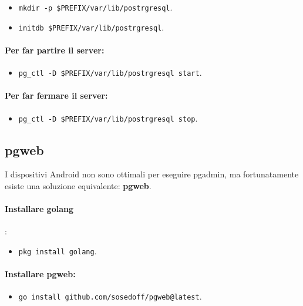 \begin{itemize}
  \item \texttt{mkdir -p \$PREFIX/var/lib/postrgresql}.
  \item \texttt{initdb \$PREFIX/var/lib/postrgresql}.
\end{itemize}

\paragraph{Per far partire il server:}

\begin{itemize}
  \item \texttt{pg\_ctl -D \$PREFIX/var/lib/postrgresql start}.
\end{itemize}

\paragraph{Per far fermare il server:}

\begin{itemize}
  \item \texttt{pg\_ctl -D \$PREFIX/var/lib/postrgresql stop}.
\end{itemize}

\subsection{pgweb}

I dispositivi Android non sono ottimali per eseguire pgadmin, ma fortunatamente esiste una soluzione equivalente: \textbf{pgweb}. 

\paragraph{Installare golang}:

\begin{itemize}
  \item \texttt{pkg install golang}. 
\end{itemize}

\paragraph{Installare pgweb:}

\begin{itemize}
  \item \texttt{go install github.com/sosedoff/pgweb@latest}.
\end{itemize}

